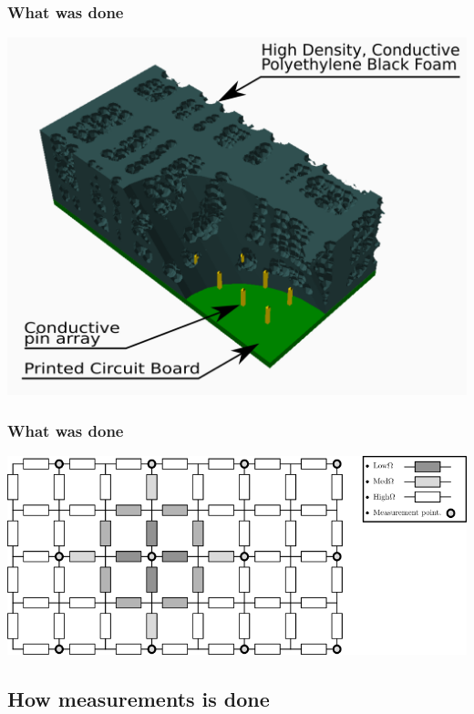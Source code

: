 \documentclass{beamer}
\begin{document}
\begin{frame}
    \frametitle{What was done}
    \begin{center}
        \includegraphics[width=.8\textwidth]{img/sensor_with_arrows_and_text.png}
    \end{center}
\end{frame}

\begin{frame}
    \frametitle{What was done}
    \begin{center}
        \includegraphics[width=.8\textwidth]{img/resistor_mapp_modell.png}
    \end{center}
\end{frame}

\subsection{How measurements is done}%
\label{sub:howmmesurment}
\end{document}
